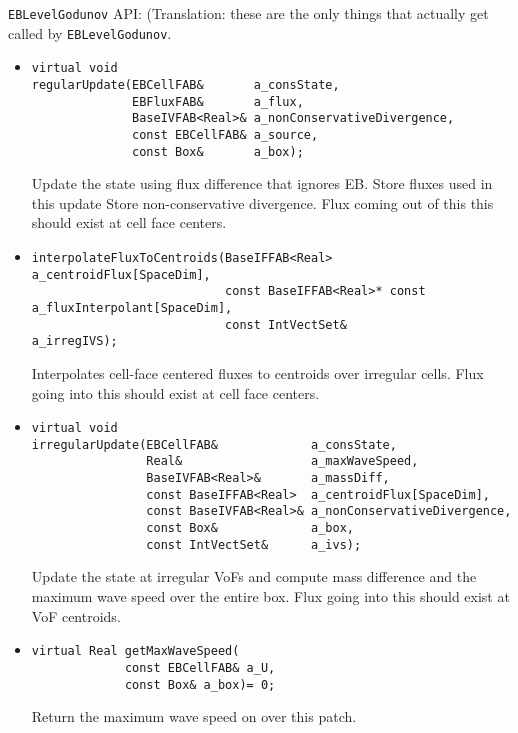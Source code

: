 \noindent
{\tt EBLevelGodunov} API:
(Translation: these
are the only things that actually get called
by {\tt EBLevelGodunov}.
\begin{itemize}
\item \begin{small}\begin{verbatim}
virtual void 
regularUpdate(EBCellFAB&       a_consState,
              EBFluxFAB&       a_flux,
              BaseIVFAB<Real>& a_nonConservativeDivergence,
              const EBCellFAB& a_source, 
              const Box&       a_box);
\end{verbatim}\end{small}
Update the state using flux difference that ignores EB.
Store fluxes used in this update
Store non-conservative divergence.
Flux coming out of this this should exist at cell face centers.

\item \begin{small}\begin{verbatim}
interpolateFluxToCentroids(BaseIFFAB<Real>              a_centroidFlux[SpaceDim],
                           const BaseIFFAB<Real>* const a_fluxInterpolant[SpaceDim],
                           const IntVectSet&            a_irregIVS);
\end{verbatim}\end{small}
Interpolates cell-face centered fluxes to centroids over irregular cells.
Flux going into this should exist at cell face centers.

\item \begin{small}\begin{verbatim}
virtual void 
irregularUpdate(EBCellFAB&             a_consState,
                Real&                  a_maxWaveSpeed,
                BaseIVFAB<Real>&       a_massDiff,
                const BaseIFFAB<Real>  a_centroidFlux[SpaceDim],
                const BaseIVFAB<Real>& a_nonConservativeDivergence,
                const Box&             a_box,
                const IntVectSet&      a_ivs);
\end{verbatim}\end{small}
Update the state at irregular VoFs and compute mass difference and 
the maximum wave speed over the entire box. Flux going into this
should exist at VoF centroids. 

\item \begin{small}\begin{verbatim}
virtual Real getMaxWaveSpeed(
             const EBCellFAB& a_U,
             const Box& a_box)= 0;
\end{verbatim}\end{small}
Return the maximum wave speed on over this patch.


\end{itemize}
